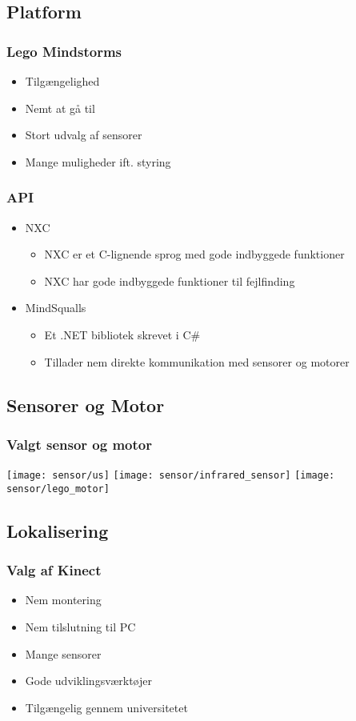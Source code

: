 \subsection{Platform}
\begin{frame}
\frametitle{Lego Mindstorms}
\begin{itemize}
\item Tilgængelighed
\item Nemt at gå til
\item Stort udvalg af sensorer
\item Mange muligheder ift. styring
\end{itemize}
\end{frame}

\begin{frame}
\frametitle{API}
\begin{itemize}
\item NXC
\begin{itemize}
\item NXC er et C-lignende sprog med gode indbyggede funktioner
\item NXC har gode indbyggede funktioner til fejlfinding
\end{itemize}
\item MindSqualls
\begin{itemize}
\item Et .NET bibliotek skrevet i C\#
\item Tillader nem direkte kommunikation med sensorer og motorer
\end{itemize}
\end{itemize}
\end{frame}
\subsection{Sensorer og Motor}
\frametitle{Valgt sensor og motor}
\begin{frame}
\texttt{[image: sensor/us]}
\texttt{[image: sensor/infrared\_sensor]}
\texttt{[image: sensor/lego\_motor]}
\end{frame}
\subsection{Lokalisering}
\begin{frame}
\frametitle{Valg af Kinect}
\begin{itemize}
\item Nem montering
\item Nem tilslutning til PC
\item Mange sensorer
\item Gode udviklingsværktøjer
\item Tilgængelig gennem universitetet
\end{itemize}
\end{frame}
